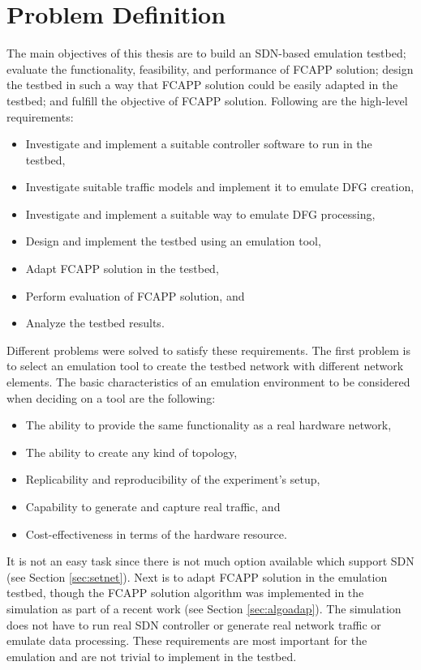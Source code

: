 \section{Problem Definition}\label{sec:pd}
The main objectives of this thesis are to build an SDN-based emulation testbed; evaluate the functionality, feasibility, and performance of FCAPP solution; design the testbed in such a way that FCAPP solution could be easily adapted in the testbed; and fulfill the objective of FCAPP solution. Following are the high-level requirements:

\begin{itemize}
	\item Investigate and implement a suitable controller software to run in the testbed,
	\item Investigate suitable traffic models and implement it to emulate DFG creation,
	\item Investigate and implement a suitable way to emulate DFG processing,
	\item Design and implement the testbed using an emulation tool,
	\item Adapt FCAPP solution in the testbed, 
	\item Perform evaluation of FCAPP solution, and
	\item Analyze the testbed results. 
\end{itemize}

Different problems were solved to satisfy these requirements. The first problem is to select an emulation tool to create the testbed network with different network elements. The basic characteristics of an emulation environment to be considered when deciding on a tool are the following:
\begin{itemize}
	\item The ability to provide the same functionality as a real hardware network,
	\item The ability to create any kind of topology,
	\item Replicability and reproducibility of the experiment's setup,
	\item Capability to generate and capture real traffic, and
	\item Cost-effectiveness in terms of the hardware resource.
\end{itemize}
It is not an easy task since there is not much option available which support SDN (see Section \ref{sec:setnet}). Next is to adapt FCAPP solution in the emulation testbed, though the FCAPP solution algorithm was implemented in the simulation as part of a recent work \cite{7343600} (see Section \ref{sec:algoadap}). The simulation does not have to run real SDN controller or generate real network traffic or emulate data processing. These requirements are most important for the emulation and are not trivial to implement in the testbed.


